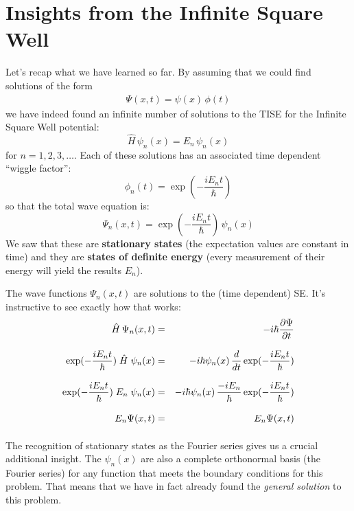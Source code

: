 \documentclass[12pt]{book}
\begin{document}
\section{Insights from the Infinite Square Well}

Let's recap what we have learned so far.  By assuming that we could find solutions of the form
\begin{eqnarray*}
\Psi(x,t) = \psi(x) \, \phi(t)
\end{eqnarray*}
we have indeed found an infinite number of solutions to the TISE for the Infinite Square Well potential:
\begin{equation*}
\hat{H} \, \psi_n(x) = E_n \, \psi_n(x)
\end{equation*}
for $n=1,2,3,\dots$. Each of these solutions has an associated time dependent ``wiggle factor'':
\begin{equation*}
\phi_n(t) = \exp(-\frac{i E_n t}{\hbar})
\end{equation*}
so that the total wave equation is:
\begin{equation*}
\Psi_n(x,t) = \exp(-\frac{i E_n t}{\hbar}) \, \psi_n(x)
\end{equation*}
We saw that these are {\bf stationary states} (the expectation values are constant in time) and they are {\bf states of definite energy} (every measurement of their energy will yield the results $E_n$).

The wave functions $\Psi_n(x,t)$ are solutions to the (time dependent) SE.  It's instructive to see exactly how that works:
\begin{eqnarray*}
\hat{H} \, \Psi_n(x,t) &=& -i \hbar \frac{\partial\Psi}{\partial t}\\[8pt]
\exp(-\frac{i E_n t}{\hbar}) \; \hat{H} \; \psi_n(x) &=& -i \hbar \psi_n(x) \, \frac{d}{dt}
\exp(-\frac{i E_n t}{\hbar})\\[8pt]
\exp(-\frac{i E_n t}{\hbar}) \; E_n \; \psi_n(x) &=& -i \hbar \psi_n(x) \, \frac{-iE_n}{\hbar}
\exp(-\frac{i E_n t}{\hbar})\\[8pt]
E_n \Psi(x,t) &=& E_n \Psi(x,t)\\[8pt]
\end{eqnarray*}
The recognition of stationary states as the Fourier series gives us a crucial additional insight.  The $\psi_n(x)$ are also a complete orthonormal basis (the Fourier series) for any function that meets the boundary conditions for this problem.  That means that we have in fact already found the {\em general solution} to this problem.
\end{document}
